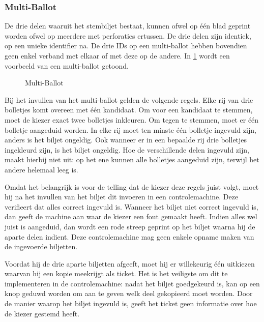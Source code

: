 \subsubsection{Multi-Ballot}
\label{sec:ls:multi-ballot}

De drie delen waaruit het stembiljet bestaat, kunnen ofwel op één blad geprint worden ofwel op meerdere met perforaties ertussen. De drie delen zijn identiek, op een unieke identifier na. De drie IDs op een multi-ballot hebben bovendien geen enkel verband met elkaar of met deze op de andere. In \ref{fig:ls:threeballot} wordt een voorbeeld van een multi-ballot getoond.

\begin{figure}[H]
	\caption{Multi-Ballot\cite{rivest_threeballot}}
	\label{fig:ls:threeballot}
\end{figure}

\npar Bij het invullen van het multi-ballot gelden de volgende regels. Elke rij van drie bolletjes komt overeen met \'e\'en kandidaat. Om voor een kandidaat te stemmen, moet de kiezer exact twee bolletjes inkleuren. Om tegen te stemmen, moet er \'e\'en bolletje aangeduid worden. In elke rij moet ten minste \'e\'en bolletje ingevuld zijn, anders is het biljet ongeldig. Ook wanneer er in een bepaalde rij drie bolletjes ingekleurd zijn, is het biljet ongeldig. Hoe de verschillende delen ingevuld zijn, maakt hierbij niet uit: op het ene kunnen alle bolletjes aangeduid zijn, terwijl het andere helemaal leeg is.

\npar Omdat het belangrijk is voor de telling dat de kiezer deze regels juist volgt, moet hij na het invullen van het biljet dit invoeren in een controlemachine. Deze verifieert dat alles correct ingevuld is. Wanneer het biljet niet correct ingevuld is, dan geeft de machine aan waar de kiezer een fout gemaakt heeft. Indien alles wel juist is aangeduid, dan wordt een rode streep geprint op het biljet waarna hij de aparte delen indient. Deze controlemachine mag geen enkele opname maken van de ingevoerde biljetten.

\npar Voordat hij de drie aparte biljetten afgeeft, moet hij er willekeurig \'e\'en uitkiezen waarvan hij een kopie meekrijgt als ticket. Het is het veiligste om dit te implementeren in de controlemachine: nadat het biljet goedgekeurd is, kan op een knop geduwd worden om aan te geven welk deel gekopieerd moet worden. Door de manier waarop het biljet ingevuld is, geeft het ticket geen informatie over hoe de kiezer gestemd heeft.

